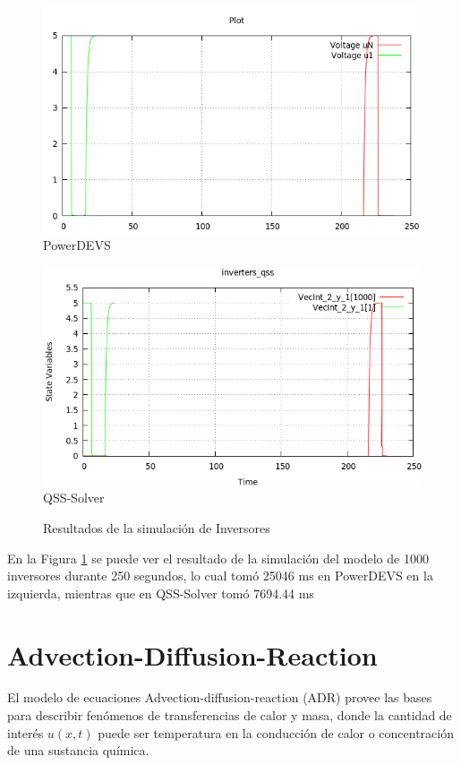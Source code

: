 \begin{figure}[H]
\centering
\begin{minipage}{0.5\textwidth}
 \includegraphics[width=\linewidth]{inversers-pd.png}
\centering
PowerDEVS
\end{minipage}\hfill
\begin{minipage}{0.5\textwidth}
 \includegraphics[width=\linewidth]{inversers-qss.png}
\centering
QSS-Solver
\end{minipage}
\caption{Resultados de la simulación de Inversores}\label{graph:inverters}
\end{figure}

En la Figura \ref{graph:inverters} se puede ver el resultado de la simulación del modelo de 1000 inversores durante 250 segundos, lo cual tomó 25046 ms en PowerDEVS en 
	la izquierda, mientras que en QSS-Solver tomó 7694.44 ms	

\section{Advection-Diffusion-Reaction}
	El modelo de ecuaciones Advection-diffusion-reaction (ADR) provee las bases para describir fenómenos de transferencias de calor y masa, donde la cantidad de interés $u(x,t)$ puede ser temperatura en la conducción de calor o concentración de una sustancia química.

